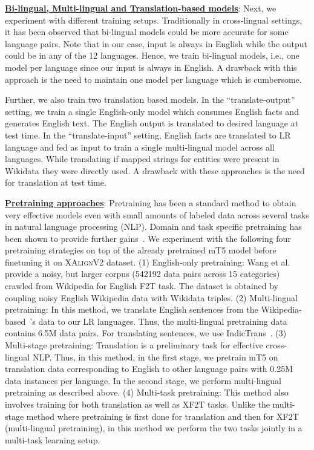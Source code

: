 \documentclass[runningheads]{llncs}
\newcommand{\data}{\textsc{XAlignV2}}
\begin{document}
\noindent\underline{\textbf{Bi-lingual, Multi-lingual and Translation-based models}}: Next, we experiment with different training setups. Traditionally in cross-lingual settings, it has been observed that bi-lingual models could be more accurate for some language pairs. Note that in our case, input is always in English while the output could be in any of the 12 languages. Hence, we train bi-lingual models, i.e., one model per language since our input is always in English. A drawback with this approach is the need to maintain one model per language which is cumbersome.

Further, we also train two translation based models. In the ``translate-output'' setting, we train a single English-only model which consumes English facts and generates English text. The English output is translated to desired language at test time. In the ``translate-input'' setting, English facts are translated to LR language and fed as input to train a single multi-lingual model across all languages. While translating if mapped strings for entities were present in Wikidata they were directly used. A drawback with these approaches is the need for translation at test time.

\noindent\underline{\textbf{Pretraining approaches}}: Pretraining has been a standard method to obtain very effective models even with small amounts of labeled data across several tasks in natural language processing (NLP). Domain and task specific pretraining has been shown to provide further gains~\cite{gururangan2020don}. We experiment with the following four pretraining strategies on top of the already pretrained mT5 model before finetuning it on \data{} dataset.
(1) English-only pretraining: Wang et al.~\cite{wang2021stage} provide a noisy, but larger corpus (542192 data pairs across 15 categories) crawled from Wikipedia for English F2T task. The dataset is obtained by coupling noisy English Wikipedia data with Wikidata triples. 
(2) Multi-lingual pretraining: In this method, we translate English sentences from the Wikipedia-based~\cite{wang2021stage}'s data to our LR languages. Thus, the multi-lingual pretraining data contains 6.5M data pairs. For translating sentences, we use IndicTrans~\cite{ramesh2021samanantar}. 
(3) Multi-stage pretraining: Translation is a preliminary task for effective cross-lingual NLP. Thus, in this method, in the first stage, we pretrain mT5 on translation data corresponding to English to other language pairs with 0.25M data instances per language. In the second stage, we perform multi-lingual pretraining as described above.
(4) Multi-task pretraining: This method also involves training for both translation as well as XF2T tasks. Unlike the multi-stage method where pretraining is first done for translation and then for XF2T (multi-lingual pretraining), in this method we perform the two tasks jointly in a multi-task learning setup.
\end{document}
